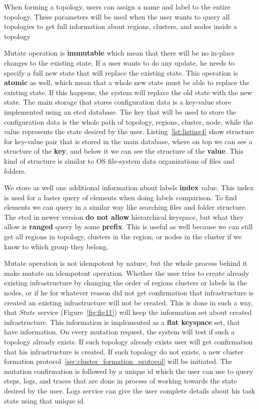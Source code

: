 When forming a topology, users can assign a name and label to the entire topology. These parameters will be used when the user wants to query all topologies to get full information about regions, clusters, and nodes inside a topology

Mutate operation is \textbf{immutable} which mean that there will be no in-place changes to the existing state. If a user wants to do any update, he needs to specify a full new state that will replace the existing state. This operation is \textbf{atomic} as well, which mean that a whole new state must be able to replace the existing state. If this happens, the system will replace the old state with the new state. The main storage that stores configuration data is a key-value store implemented using an etcd database. The key that will be used to store the configuration data is the whole path of topology, regions, cluster, node, while the value represents the state desired by the user. Listing~\ref{lst:listing4} show structure for key-value pair that is stored in the main database, where on top we can see a structure of the \textbf{key}, and below it we can see the structure of the \textbf{value}. This kind of structure is similar to OS file-system data organizations of files and folders.



\noindent
We store as well one additional information about labels \textbf{index} value. This index is used for a faster query of elements when doing labels comparison. To find elements we can query in a similar way like searching files and folder structure. The etcd in newer version \textbf{do not allow} hierarchical keyspace, but what they allow is \textbf{ranged} query by some \textbf{prefix}. This is useful as well because we can still get all regions in topology, clusters in the region, or nodes in the cluster if we know to which group they belong.

Mutate operation is not idempotent by nature, but the whole process behind it make mutate an idempotent operation. Whether the user tries to create already existing infrastructure by changing the order of regions clusters or labels in the nodes, or if he for whatever reason did not get confirmation that infrastructure is created an existing infrastructure will not be created. This is done in such a way, that $State$ service (Figure~\ref{fig:fig11}) will keep the information set about created infrastructure. This information is implemented as a \textbf{flat keyspace} set, that have information. On every mutation request, the system will test if such a topology already exists. If such topology already exists user will get confirmation that his infrastructure is created. If such topology do not exists, a new cluster formation protocol~\ref{sec:cluster_formation_protocol} will be initiated. The mutation confirmation is followed by a unique id which the user can use to query steps, logs, and traces that are done in process of working towards the state desired by the user. Logs service can give the user complete details about his task state using that unique id.

